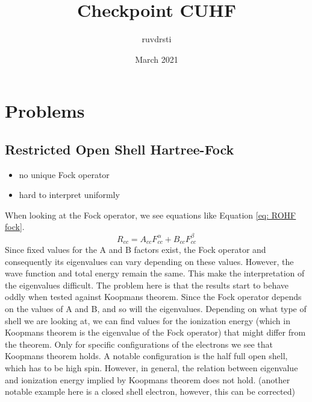 \documentclass{article}
\title{Checkpoint CUHF}
\author{ruvdrsti}
\date{March 2021}
\begin{document}
\maketitle

\section{Problems}
\label{sec:prob}
\subsection{Restricted Open Shell Hartree-Fock}
\label{subsec:ROHF}
\begin{itemize}
    \item no unique Fock operator
    \item hard to interpret uniformly
\end{itemize}
 When looking at the Fock operator, we see equations like Equation \eqref{eq: ROHF fock}.
 \begin{equation}\label{eq: ROHF fock}
     R_{cc} = A_{cc}F^\alpha_{cc} + B_{cc}F^\beta_{cc}
 \end{equation}
Since fixed values for the A and B factors exist, the Fock operator and consequently its eigenvalues can vary depending on these values. However, the wave function and total energy 
remain the same. This make the interpretation of the eigenvalues difficult. The problem here is that the results start to behave oddly when tested against Koopmans theorem. Since the
Fock operator depends on the values of A and B, and so will the eigenvalues. Depending on what type of shell we are looking at, we can find values for the ionization energy (which in 
Koopmans theorem is the eigenvalue of the Fock operator) that might differ from the theorem. Only for specific configurations of the electrons we see that Koopmans theorem holds. A 
notable configuration is the half full open shell, which has to be high spin. However, in general, the relation between eigenvalue and ionization energy implied by Koopmans theorem
does not hold. (another notable example here is a closed shell electron, however, this can be corrected)
\end{document}
